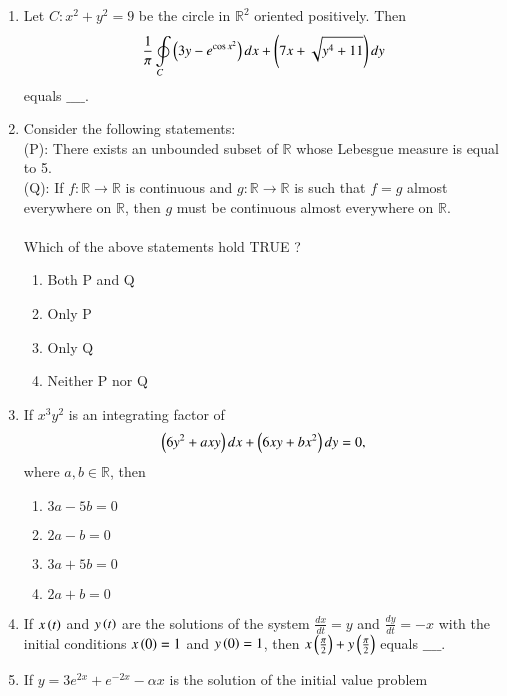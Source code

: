 \documentclass[journal]{IEEEtran}
\begin{document}
\begin{enumerate}
\begin{enumerate}
\end{enumerate}
\item Let $C : x^2 + y^2 = 9$ be the circle in $\mathbb{R}^2$ oriented positively. Then
\begin{align*}
    \frac{1}{\pi} \oint\limits_{C} \left(3y - e^{\cos x^2}\right) dx + \left(7x + \sqrt{y^4 + 11}\right)dy
\end{align*}
equals $\_\_\_\_$. \\
\item Consider the following statements: \\
(P): There exists an unbounded subset of $\mathbb{R}$ whose Lebesgue measure is equal to 5. \\
(Q): If $f : \mathbb{R} \rightarrow \mathbb{R}$ is continuous and $g : \mathbb{R} \rightarrow \mathbb{R}$ is such that $f = g$ almost everywhere on $\mathbb{R}$, then $g$ must be continuous almost everywhere on $\mathbb{R}$. \\\\
Which of the above statements hold TRUE ?
\begin{enumerate}
    \item Both P and Q
    \item Only P
    \item Only Q
    \item Neither P nor Q \\
\end{enumerate}
\item If $x^3y^2$ is an integrating factor of 
\begin{align*}
    \left(6y^2 + axy\right)dx + \left(6xy + bx^2\right)dy = 0,
\end{align*}
where $a, b \in \mathbb{R}$, then
\begin{enumerate}
    \item $3a - 5b = 0$
    \item $2a - b = 0$
     \item $3a + 5b = 0$
    \item $2a + b = 0$ \\
\end{enumerate}
\item If $x\left(t\right)$ and $y\left(t\right)$ are the solutions of the system $\frac{dx}{dt} = y$ and $\frac{dy}{dt} = -x$ with the initial conditions $x\left(0\right) = 1$ and $y\left(0\right) = 1$, then $x\left(\frac{\pi}{2}\right) + y\left(\frac{\pi}{2}\right)$ equals $\_\_\_\_$. \\
\item If $y = 3e^{2x} + e^{-2x} - \alpha x$ is the solution of the initial value problem 

\end{enumerate}
\end{document}
